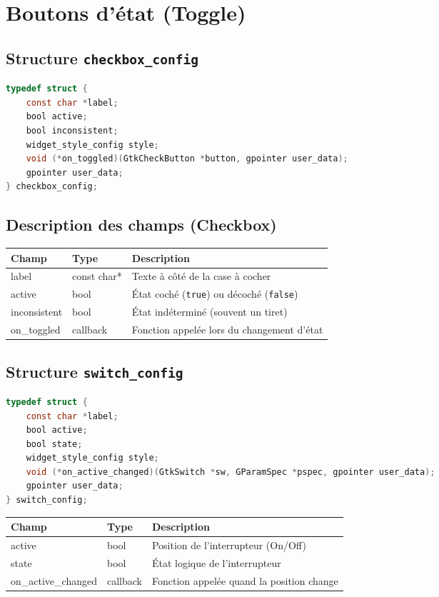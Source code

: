 \section{Boutons d'état (Toggle)}

\subsection{Structure \texttt{checkbox\_config}}
\begin{lstlisting}[language=C]
typedef struct {
    const char *label;
    bool active;
    bool inconsistent;
    widget_style_config style;
    void (*on_toggled)(GtkCheckButton *button, gpointer user_data);
    gpointer user_data;
} checkbox_config;
\end{lstlisting}

\subsection{Description des champs (Checkbox)}
\begin{center}
\begin{tabular}{|l|l|p{5cm}|}
\hline
\textbf{Champ} & \textbf{Type} & \textbf{Description} \\
\hline
label & const char* & Texte à côté de la case à cocher \\
\hline
active & bool & État coché (\texttt{true}) ou décoché (\texttt{false}) \\
\hline
inconsistent & bool & État indéterminé (souvent un tiret) \\
\hline
on\_toggled & callback & Fonction appelée lors du changement d'état \\
\hline
\end{tabular}
\end{center}

\subsection{Structure \texttt{switch\_config}}
\begin{lstlisting}[language=C]
typedef struct {
    const char *label;
    bool active;
    bool state;
    widget_style_config style;
    void (*on_active_changed)(GtkSwitch *sw, GParamSpec *pspec, gpointer user_data);
    gpointer user_data;
} switch_config;
\end{lstlisting}

\begin{center}
\begin{tabular}{|l|l|>{\raggedright\arraybackslash}p{6cm}|}
\hline
\textbf{Champ} & \textbf{Type} & \textbf{Description} \\
\hline
active & bool & Position de l'interrupteur (On/Off) \\
\hline
state & bool & État logique de l'interrupteur \\
\hline
on\_active\_changed & callback & Fonction appelée quand la position change \\
\hline
\end{tabular}
\end{center}